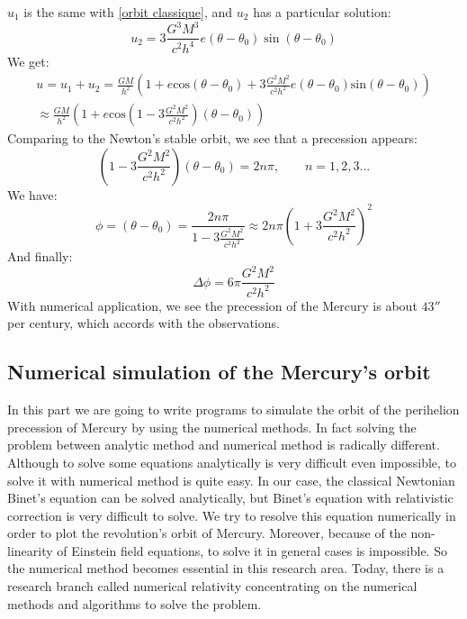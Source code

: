 $u_1$ is the same with \eqref{orbit classique}, and $u_2$ has a particular solution:
%
\begin{equation}
	u_2=3\frac{G^3M^3}{c^2h^4}e\left( \theta-\theta_0\right)\sin
	\left( \theta-\theta_0\right)
\end{equation}
%
We get:
%
\begin{equation}
\begin{aligned}
	u=u_1+u_2=\frac{GM}{h^2}\left(1+e\mathrm{cos} \left( \theta-\theta_0\right)
	+3\frac{G^2M^2}{c^2h^2}e\left( \theta-\theta_0\right)\mathrm{sin}
	\left( \theta-\theta_0\right)\right)
	\\
	\approx \frac{GM}{h^2}\left( 1+e\mathrm{cos}\left( 1-3\frac{G^2M^2}{c^2h^2}\right)
	\left( \theta-\theta_0\right)\right) 
\end{aligned}
\end{equation}
%
Comparing to the Newton's stable orbit, we see that a precession appears:
%
\begin{equation}
	\left( 1-3\frac{G^2M^2}{c^2h^2}\right) \left( \theta-\theta_0\right)=2n\pi,
	\qquad n=1,2,3...
\end{equation}
%
We have:
%
\begin{equation}
	\phi=\left( \theta-\theta_0\right)=\frac{2n\pi}{1-3\frac{G^2M^2}{c^2h^2}}\approx
	2n\pi \left( 1+3\frac{G^2M^2}{c^2h^2}\right) ^2
\end{equation}
%
And finally:
%
\begin{equation}
	\Delta\phi=6\pi\frac{G^2M^2}{c^2h^2} 
\end{equation}
%
With numerical application, we see the precession of the Mercury is about $43''$ per
century, which accords with the observations.

\subsection{Numerical simulation of the Mercury's orbit}

In this part we are going to write programs to simulate the orbit of the perihelion
precession of Mercury by using the numerical methods. In fact solving the problem between
analytic method and numerical method is radically different. Although to solve some
equations analytically is very difficult even impossible, to solve it with numerical
method is quite easy. In our case, the classical Newtonian Binet's equation can be
solved analytically, but Binet's equation with relativistic correction is very
difficult to solve. We try to resolve this equation numerically in order to plot the
revolution's orbit of Mercury. Moreover, because of the non-linearity of Einstein field
equations, to solve it in general cases is impossible. So the numerical method becomes
essential in this research area. Today, there is a research branch called numerical
relativity concentrating on the numerical methods and algorithms to solve the problem.

